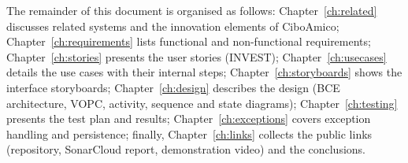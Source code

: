 The remainder of this document is organised as follows: Chapter~\ref{ch:related}
discusses related systems and the innovation elements of CiboAmico;
Chapter~\ref{ch:requirements} lists functional and non-functional requirements;
Chapter~\ref{ch:stories} presents the user stories (INVEST);
Chapter~\ref{ch:usecases} details the use cases with their internal steps;
Chapter~\ref{ch:storyboards} shows the interface storyboards;
Chapter~\ref{ch:design} describes the design (BCE architecture, VOPC, activity,
sequence and state diagrams); Chapter~\ref{ch:testing} presents the test plan
and results; Chapter~\ref{ch:exceptions} covers exception handling and
persistence; finally, Chapter~\ref{ch:links} collects the public links
(repository, SonarCloud report, demonstration video) and the conclusions.
